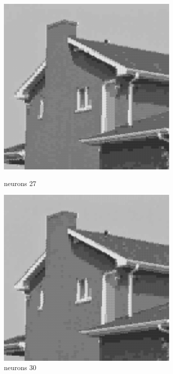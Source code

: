 \documentclass[../IDP_Task5_Karwowski_Kowalewski.tex]{subfiles}
\begin{document}
{{        \begin{figure}[!htbp]
            \begin{minipage}[c]{0.45\linewidth}
                \centering
                \includegraphics[width=0.8\textwidth]{img/kowalewski/crop_size_4_neurons_27.png}
                \caption{neurons 27}
            \end{minipage}\hfill
            \begin{minipage}[c]{0.45\linewidth}
                \centering
                \includegraphics[width=0.8\textwidth]{img/kowalewski/crop_size_4_neurons_30.png}
                \caption{neurons 30}
            \end{minipage}
        \end{figure}

}}
\end{document}
